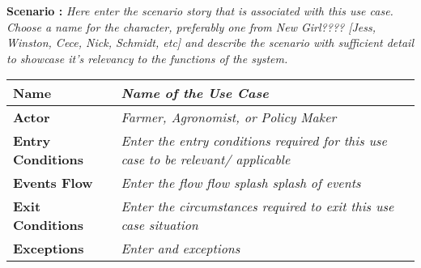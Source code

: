 \begin{flushleft}
\textbf{Scenario :} 
\textit{Here enter the scenario story that is associated with this use case. Choose a name for the character, preferably one from New Girl???? [Jess, Winston, Cece, Nick, Schmidt, etc] and describe the scenario with sufficient detail to showcase it's relevancy to the functions of the system.}
\end{flushleft}

\begin{center}
\begin{tabular}{|l|>{\raggedright\arraybackslash}m{12cm}|}

    \hline
    \textbf{Name} & \textit{Name of the Use Case}\\
    \hline
   	\textbf{Actor} & \textit{Farmer, Agronomist, or Policy Maker}\\
    \hline
    \textbf{Entry Conditions} & \textit{Enter the entry conditions required for this use case to be relevant/ applicable}\\
    \hline
    \textbf{Events Flow} & \textit{Enter the flow flow splash splash of events}\\
    \hline
    \textbf{Exit Conditions} & \textit{Enter the circumstances required to exit this use case situation}\\
    \hline
    \textbf{Exceptions} & \textit{Enter and exceptions}\\
    \hline
\end{tabular}
\end{center}